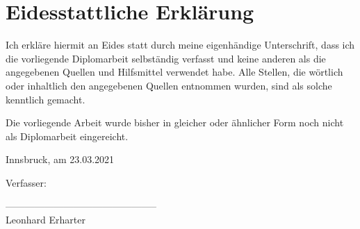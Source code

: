 \section*{Eidesstattliche Erklärung}

Ich erkläre hiermit an Eides statt durch meine eigenhändige Unterschrift, dass ich die vorliegende Diplomarbeit selbständig verfasst und keine anderen als die angegebenen Quellen und Hilfsmittel verwendet habe. Alle Stellen, die wörtlich oder inhaltlich den angegebenen Quellen entnommen wurden, sind als solche kenntlich gemacht.

Die vorliegende Arbeit wurde bisher in gleicher oder ähnlicher Form noch nicht als Diplomarbeit eingereicht.

Innsbruck, am 23.03.2021

\vspace*{3cm}



Verfasser:

\vspace*{2cm}


-----------------------------------------------\\
\hspace*{1.3cm}           Leonhard Erharter

\newpage